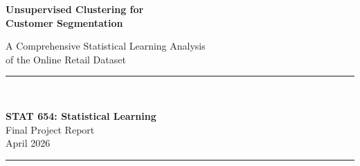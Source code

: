 \documentclass[12pt,a4paper]{article}
\begin{document}
\begin{titlepage}
  \centering
  \vspace*{2cm}
  {\Huge\bfseries Unsupervised Clustering for\\[0.4em]
   Customer Segmentation\par}
  \vspace{0.5cm}
  {\Large A Comprehensive Statistical Learning Analysis\\
   of the Online Retail Dataset\par}
  \vspace{2cm}
  \rule{0.6\textwidth}{0.4pt}\\[0.5cm]
  {\large\textbf{STAT 654: Statistical Learning}\\[0.3cm]
   Final Project Report\\[0.3cm]
   April 2026\par}
  \rule{0.6\textwidth}{0.4pt}
  \vfill
  \begin{abstract}
    \noindent
    This project applies unsupervised statistical learning techniques to segment
    customers of a UK-based online retailer using transactional data from 2010--2011.
    Starting from 541,909 raw transaction records, we engineer a rich eight-dimensional
    feature space grounded in the RFM (Recency, Frequency, Monetary) framework and
    supplemented by behavioral metrics.  After rigorous preprocessing, log-transformation,
    and standardisation, Principal Component Analysis reduces the feature space to four
    orthogonal components explaining 93.59\% of total variance.  Three clustering
    algorithms---K-Means, Agglomerative Hierarchical, and DBSCAN---are compared
    using Silhouette Score, Davies-Bouldin Index, and Calinski-Harabasz Index.
    K-Means with $k{=}3$ is selected as the preferred model, yielding three well-separated,
    actionable segments: \emph{Hibernating}, \emph{Active/Loyal}, and \emph{Champions}.
    The Champion segment (30.2\% of customers) drives 82\% of total revenue.  A
    supervised Logistic Regression validation achieves 99.65\% test accuracy, confirming
    the statistical coherence of the discovered segments.  Business recommendations
    for targeted retention, growth, and reactivation strategies are provided for each segment.
  \end{abstract}
\end{titlepage}

\tableofcontents
\newpage
\end{document}
